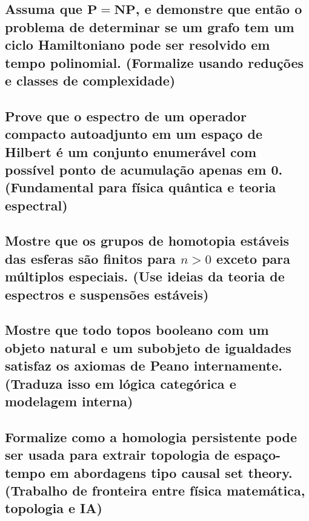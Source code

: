 \documentclass{article}
\begin{document}
\subsection{Assuma que $\mathbf{P} = \mathbf{NP}$, e demonstre que então o problema de determinar se um grafo tem um ciclo Hamiltoniano pode ser resolvido em tempo polinomial. (Formalize usando reduções e classes de complexidade)}

\subsection{Prove que o espectro de um operador compacto autoadjunto em um espaço de Hilbert é um conjunto enumerável com possível ponto de acumulação apenas em 0. (Fundamental para física quântica e teoria espectral)}

\subsection{Mostre que os grupos de homotopia estáveis das esferas são finitos para $n \gt 0$  exceto para múltiplos especiais. (Use ideias da teoria de espectros e suspensões estáveis)}

\subsection{Mostre que todo topos booleano com um objeto natural e um subobjeto de igualdades satisfaz os axiomas de Peano internamente. (Traduza isso em lógica categórica e modelagem interna)}

\subsection{Formalize como a homologia persistente pode ser usada para extrair topologia de espaço-tempo em abordagens tipo causal set theory. (Trabalho de fronteira entre física matemática, topologia e IA)}
\end{document}
